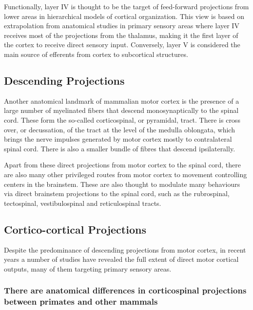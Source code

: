 Functionally, layer IV is thought to be the target of feed-forward projections from lower areas in hierarchical models of cortical organization. This view is based on extrapolation from anatomical studies in primary sensory areas where layer IV receives most of the projections from the thalamus, making it the first layer of the cortex to receive direct sensory input. Conversely, layer V is considered the main source of efferents from cortex to subcortical structures.

\subsection{Descending Projections}

Another anatomical landmark of mammalian motor cortex is the presence of a large number of myelinated fibers that descend monosynaptically to the spinal cord. These form the so-called corticospinal, or pyramidal, tract. There is cross over, or decussation, of the tract at the level of the medulla oblongata, which brings the nerve impulses generated by motor cortex mostly to contralateral spinal cord. There is also a smaller bundle of fibres that descend ipsilaterally.

Apart from these direct projections from motor cortex to the spinal cord, there are also many other privileged routes from motor cortex to movement controlling centers in the brainstem. These are also thought to modulate many behaviours via direct brainstem projections to the spinal cord, such as the rubrospinal, tectospinal, vestibulospinal and reticulospinal tracts.

\subsection{Cortico-cortical Projections}

Despite the predominance of descending projections from motor cortex, in recent years a number of studies have revealed the full extent of direct motor cortical outputs, many of them targeting primary sensory areas.

\subsubsection*{There are anatomical differences in corticospinal projections between primates and other mammals}


